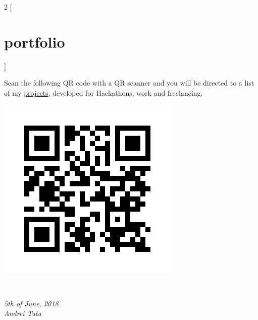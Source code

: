 \documentclass[]{friggeri-cv}
\begin{document}
\begin{multicols}{2}
[
\section{portfolio}
]

Scan the following QR code with a QR scanner and you will be directed to a list of my 
\hyperref[https://github.com/andreituta/cv]{projects}, developed for Hackathons, work and freelancing.
    
   \begin{flushright}
   \includegraphics[scale=0.30]{img/static_qr_code_without_logo.jpg}
\end{flushright}

   
\end{multicols}
\\
\begin{flushleft}
\emph{5th of June, 2018}
\\
\emph{Andrei Tuta}
\end{flushleft}
\end{document}
